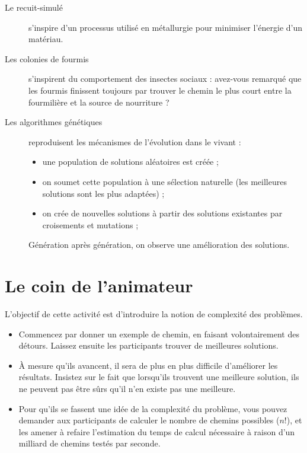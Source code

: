 \begin{description}
  \item[Le recuit-simulé] s'inspire d'un processus utilisé en métallurgie pour minimiser l'énergie d'un matériau.
  \item[Les colonies de fourmis] s'inspirent du comportement des insectes
    sociaux : avez-vous remarqué que les fourmis finissent toujours par trouver le chemin le plus court entre la fourmilière et la source de nourriture ?
  \item[Les algorithmes génétiques] reproduisent les mécanismes de l'évolution dans le vivant :
    \begin{itemize}
      \item une population de solutions aléatoires est créée ;
      \item on soumet cette population à une sélection naturelle (les meilleures solutions sont les plus adaptées) ;
      \item on crée de nouvelles solutions à partir des solutions existantes par croisements et mutations ;
    \end{itemize}
    Génération après génération, on observe une amélioration des solutions.
\end{description}

\section*{Le coin de l'animateur}

L'objectif de cette activité est d'introduire la notion de complexité des problèmes.

\begin{itemize}
  \item Commencez par donner un exemple de chemin, en faisant volontairement des détours. Laissez ensuite les participants trouver de meilleures solutions. 
  \item À mesure qu'ils avancent, il sera de plus en plus difficile d'améliorer
    les résultats. Insistez sur le fait que lorsqu'ils trouvent une meilleure
    solution, ils ne peuvent pas être sûrs qu'il n'en existe pas une meilleure.
  \item Pour qu'ils se fassent une idée de la complexité du problème, vous pouvez demander aux participants de calculer le nombre de chemins possibles ($n!$), et les amener à refaire l'estimation du temps de calcul nécessaire à raison d'un milliard de chemins testés par seconde.
\end{itemize}

